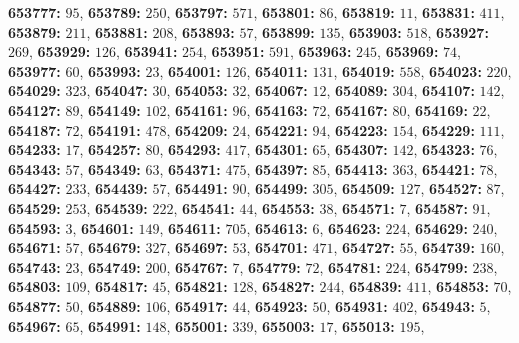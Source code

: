 \textsf{\bfseries 653777:} $95$, \textsf{\bfseries 653789:} $250$, \textsf{\bfseries 653797:} $571$, \textsf{\bfseries 653801:} $86$, \textsf{\bfseries 653819:} $11$, \textsf{\bfseries 653831:} $411$, \textsf{\bfseries 653879:} $211$, \textsf{\bfseries 653881:} $208$, \textsf{\bfseries 653893:} $57$, \textsf{\bfseries 653899:} $135$, \textsf{\bfseries 653903:} $518$, \textsf{\bfseries 653927:} $269$, \textsf{\bfseries 653929:} $126$, \textsf{\bfseries 653941:} $254$, \textsf{\bfseries 653951:} $591$, \textsf{\bfseries 653963:} $245$, \textsf{\bfseries 653969:} $74$, \textsf{\bfseries 653977:} $60$, \textsf{\bfseries 653993:} $23$, \textsf{\bfseries 654001:} $126$, \textsf{\bfseries 654011:} $131$, \textsf{\bfseries 654019:} $558$, \textsf{\bfseries 654023:} $220$, \textsf{\bfseries 654029:} $323$, \textsf{\bfseries 654047:} $30$, \textsf{\bfseries 654053:} $32$, \textsf{\bfseries 654067:} $12$, \textsf{\bfseries 654089:} $304$, \textsf{\bfseries 654107:} $142$, \textsf{\bfseries 654127:} $89$, \textsf{\bfseries 654149:} $102$, \textsf{\bfseries 654161:} $96$, \textsf{\bfseries 654163:} $72$, \textsf{\bfseries 654167:} $80$, \textsf{\bfseries 654169:} $22$, \textsf{\bfseries 654187:} $72$, \textsf{\bfseries 654191:} $478$, \textsf{\bfseries 654209:} $24$, \textsf{\bfseries 654221:} $94$, \textsf{\bfseries 654223:} $154$, \textsf{\bfseries 654229:} $111$, \textsf{\bfseries 654233:} $17$, \textsf{\bfseries 654257:} $80$, \textsf{\bfseries 654293:} $417$, \textsf{\bfseries 654301:} $65$, \textsf{\bfseries 654307:} $142$, \textsf{\bfseries 654323:} $76$, \textsf{\bfseries 654343:} $57$, \textsf{\bfseries 654349:} $63$, \textsf{\bfseries 654371:} $475$, \textsf{\bfseries 654397:} $85$, \textsf{\bfseries 654413:} $363$, \textsf{\bfseries 654421:} $78$, \textsf{\bfseries 654427:} $233$, \textsf{\bfseries 654439:} $57$, \textsf{\bfseries 654491:} $90$, \textsf{\bfseries 654499:} $305$, \textsf{\bfseries 654509:} $127$, \textsf{\bfseries 654527:} $87$, \textsf{\bfseries 654529:} $253$, \textsf{\bfseries 654539:} $222$, \textsf{\bfseries 654541:} $44$, \textsf{\bfseries 654553:} $38$, \textsf{\bfseries 654571:} $7$, \textsf{\bfseries 654587:} $91$, \textsf{\bfseries 654593:} $3$, \textsf{\bfseries 654601:} $149$, \textsf{\bfseries 654611:} $705$, \textsf{\bfseries 654613:} $6$, \textsf{\bfseries 654623:} $224$, \textsf{\bfseries 654629:} $240$, \textsf{\bfseries 654671:} $57$, \textsf{\bfseries 654679:} $327$, \textsf{\bfseries 654697:} $53$, \textsf{\bfseries 654701:} $471$, \textsf{\bfseries 654727:} $55$, \textsf{\bfseries 654739:} $160$, \textsf{\bfseries 654743:} $23$, \textsf{\bfseries 654749:} $200$, \textsf{\bfseries 654767:} $7$, \textsf{\bfseries 654779:} $72$, \textsf{\bfseries 654781:} $224$, \textsf{\bfseries 654799:} $238$, \textsf{\bfseries 654803:} $109$, \textsf{\bfseries 654817:} $45$, \textsf{\bfseries 654821:} $128$, \textsf{\bfseries 654827:} $244$, \textsf{\bfseries 654839:} $411$, \textsf{\bfseries 654853:} $70$, \textsf{\bfseries 654877:} $50$, \textsf{\bfseries 654889:} $106$, \textsf{\bfseries 654917:} $44$, \textsf{\bfseries 654923:} $50$, \textsf{\bfseries 654931:} $402$, \textsf{\bfseries 654943:} $5$, \textsf{\bfseries 654967:} $65$, \textsf{\bfseries 654991:} $148$, \textsf{\bfseries 655001:} $339$, \textsf{\bfseries 655003:} $17$, \textsf{\bfseries 655013:} $195$, 
